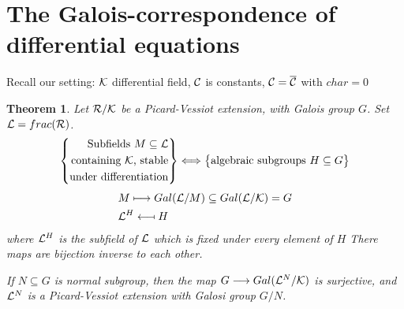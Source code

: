 \documentclass[11pt]{article}
\newtheorem{thm}{Theorem}[section]
\newcommand{\calc}{{\cal C}}
\newcommand{\calk}{{\cal K}}
\newcommand{\call}{{\cal L}}
\newcommand{\calr}{{\cal R}}
\newcommand{\lrta}{\longrightarrow}
\begin{document}
\section{The Galois-correspondence of differential equations}
Recall our setting: $\calk$ differential field, $\calc$ is constants, $\calc=\overline{\calc}$ with $char =0$
\begin{thm}
Let $\calr/\calk$ be a Picard-Vessiot extension, with Galois group $G$. Set $\call=frac(\calr)$. 
$$
\left\{
\begin{aligned}
\text{Subfields $M\subseteq \call$}\\
\text{containing $\calk$, stable}\\
\text{under differentiation}
\end{aligned}
\right\}
\Longleftrightarrow
\left\{
\begin{aligned}
\text{algebraic subgroups  $H\subseteq G$}\\
\end{aligned}
\right\}
$$
$$
\begin{aligned}
&M\longmapsto Gal(\call/M)\subseteq Gal(\call/\calk)=G\\
&\call^H\longmapsfrom H
\end{aligned}
$$
where $\call^H$ is the subfield of $\call$ which is fixed under every element of $H$
There maps are bijection inverse to each other.

If $N\subseteq G$ is normal subgroup, then the map $G\lrta Gal(\call^N/\calk)$ is surjective, and $\call^N$ is a Picard-Vessiot extension with Galosi group $G/N$.
\end{thm}
\end{document}
